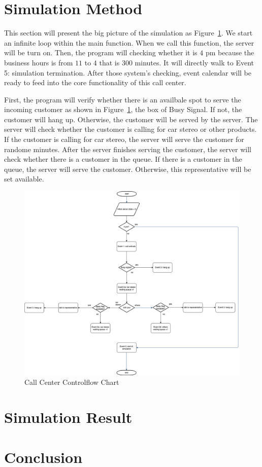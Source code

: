 \documentclass{article}
\begin{document}
\section{Simulation Method}
This section will present the big picture of the simulation as Figure~\ref{fig:call_center}. We start an infinite loop within the main function. When we call this function, the server will be turn on. Then, the program will checking whether it is $4$ pm because the business hours is from $11$ to $4$ that is $300$ minutes. It will directly walk to Event 5: simulation termination. After those system's checking, event calendar will be ready to feed into the core functionality of this call center. 

First, the program will verify whether there is an availbale spot to serve the incoming customer as shown in Figure~\ref{fig:call_center}, the box of Busy Signal. If not, the customer will hang up. Otherwise, the customer will be served by the server. The server will check whether the customer is calling for car stereo or other products. If the customer is calling for car stereo, the server will serve the customer for randome minutes. After the server finishes serving the customer, the server will check whether there is a customer in the queue. If there is a customer in the queue, the server will serve the customer. Otherwise, this representative  will be set available. 
\begin{figure}[t!]
\centering
\includegraphics[width=1.1\textwidth]{call_center.png}
\caption{Call Center Controlflow Chart}
\label{fig:call_center}
\end{figure}

\section{Simulation Result}
\section{Conclusion}
\end{document}
